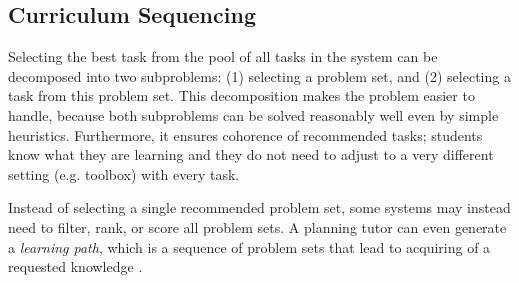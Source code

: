 

\subsection{Curriculum Sequencing}



Selecting the best task from the pool of all tasks in the system
can be decomposed into two subproblems: (1) selecting a problem set,
and (2) selecting a task from this problem set.
This decomposition makes the problem easier to handle, because
both subproblems can be solved reasonably well even by simple heuristics.
Furthermore, it ensures cohorence of recommended tasks;
students know what they are learning and they do not need to adjust to a very
different setting (e.g. toolbox) with every task.

Instead of selecting a single recommended problem set, some systems may
instead need to filter, rank, or score all problem sets.
A planning tutor can even generate a \emph{learning path}, which is a sequence
of problem sets that lead to acquiring of a requested knowledge
\cite{its-programming}.

